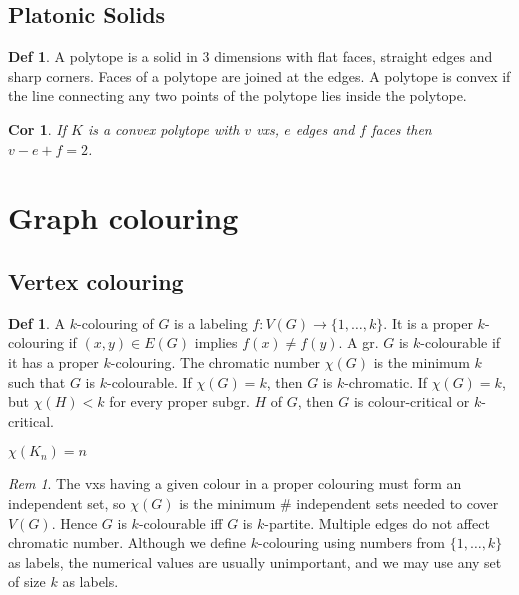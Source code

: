 \documentclass[11pt, fleqn, a4paper, landscape]{article}
\theoremstyle{plain} %
\newtheorem{cor}[thm]{Cor}
\theoremstyle{remark} %
\newtheorem{rem}[thm]{Rem}
\theoremstyle{definition} %
\newtheorem{defi}[thm]{Def}
\begin{document}
\begin{multicols}{5}
\subsection{Platonic Solids}

\begin{defi}
A polytope is a solid in 3 dimensions with flat faces, straight edges and sharp corners. Faces of a polytope are joined at the edges. A polytope is convex if the line connecting any two points of the polytope lies inside the polytope.
\end{defi}
\addtocounter{thm}{1}
\addtocounter{thm}{1}

\begin{cor}
If $K$ is a convex polytope with $v$ vxs, $e$ edges and $f$ faces then $v - e + f = 2$.
\end{cor}

\section{Graph colouring}
\subsection{Vertex colouring}

\begin{defi}
A $k$-colouring of $G$ is a labeling $f : V (G) \to \{1, \dots , k\}$. It is a proper $k$-colouring if $(x, y) \in E(G)$ implies $f(x) \ne f(y)$. A gr. $G $ is $k$-colourable if it has a proper $k$-colouring. The
chromatic number $\chi(G)$ is the minimum $k$ such that $G$ is $k$-colourable. If $\chi(G) = k$, then $G$ is
$k$-chromatic. If $\chi(G) = k$, but $\chi(H) < k$ for every proper subgr. $H$ of $G$, then $G$ is colour-critical or $k$-critical.

$\chi(K_n) = n$
\end{defi}
\addtocounter{thm}{1}
\begin{rem}
The vxs having a given colour in a proper colouring must form an independent set, so $\chi(G)$ is the minimum \# independent sets needed to cover $V (G).$ Hence $G$ is $k$-colourable iff $G$ is $k$-partite. Multiple edges do not affect chromatic number. Although we define
$k$-colouring using numbers from $\{1, \dots , k\}$ as labels, the numerical values are usually unimportant, and we may use any set of size $k$ as labels.
\end{rem}


\end{multicols}
\end{document}
